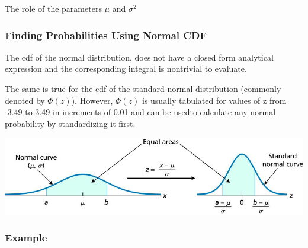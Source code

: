 \documentclass[compress]{beamer}
\begin{document}
\begin{frame}{The role of the parameters $\mu$ and $\sigma^2$}

\end{frame}


\begin{frame}\frametitle{Finding Probabilities Using Normal CDF}
The cdf of the normal distribution,  does not have a closed form analytical expression and the corresponding integral is nontrivial to evaluate. 

The same is true for the cdf of the standard normal distribution (commonly denoted by $\Phi(z)$). However, $\Phi(z)$ is usually tabulated for values of z from -3.49 to 3.49 in increments of 0.01 and can be usedto calculate any normal probability by standardizing it first.

\includegraphics[scale=.6]{figs/NormalCDFStandardization.png}
\end{frame}





\begin{frame}\frametitle{Example}
\vspace{-.1in}
\\
\vspace{2in}
\end{frame}
\end{document}
